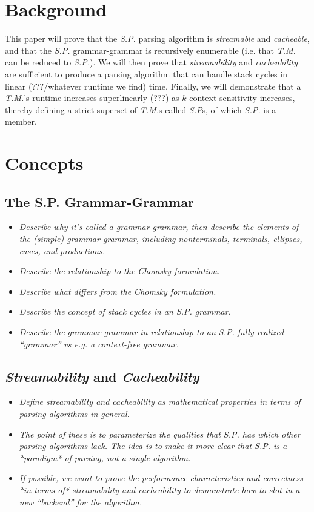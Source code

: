 \documentclass{article}
\begin{document}
\section{Background}
This paper will prove that the \textit{S.P.} parsing algorithm is \textit{streamable} and \textit{cacheable}, and that the \textit{S.P.} grammar-grammar is recursively enumerable (i.e. that \textit{T.M.} can be reduced to \textit{S.P.}). We will then prove that \textit{streamability} and \textit{cacheability} are sufficient to produce a parsing algorithm that can handle stack cycles in linear (???/whatever runtime we find) time. Finally, we will demonstrate that a \textit{T.M.}'s runtime increases superlinearly (???) as $k$-context-sensitivity increases, thereby defining a strict superset of \textit{T.M.}s called \textit{S.P}s, of which \textit{S.P.} is a member.

\section{Concepts}
\subsection{The S.P. Grammar-Grammar}
\begin{itemize}
  \item \textit{Describe why it's called a grammar-grammar, then describe the elements of the (simple) grammar-grammar, including nonterminals, terminals, ellipses, cases, and productions.}
  \item \textit{Describe the relationship to the Chomsky formulation.}
  \item \textit{Describe what differs from the Chomsky formulation.}
  \item \textit{Describe the concept of stack cycles in an S.P. grammar.}
  \item \textit{Describe the grammar-grammar in relationship to an S.P. fully-realized ``grammar'' vs e.g. a context-free grammar.}
\end{itemize}

\subsection{\textit{Streamability} and \textit{Cacheability}}
\begin{itemize}
  \item \textit{Define streamability and cacheability as mathematical properties in terms of parsing algorithms in general.}
  \item \textit{The point of these is to parameterize the qualities that S.P. has which other parsing algorithms lack. The idea is to make it more clear that S.P. is a *paradigm* of parsing, not a single algorithm.}
  \item \textit{If possible, we want to prove the performance characteristics and correctness *in terms of* streamability and cacheability to demonstrate how to slot in a new ``backend'' for the algorithm.}
\end{itemize}
\end{document}
